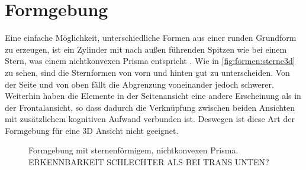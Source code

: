 \section{Formgebung}\label{sec:grundlagen:formgebung}
Eine einfache Möglichkeit, unterschiedliche Formen aus einer runden Grundform zu erzeugen, ist ein Zylinder mit nach außen führenden Spitzen wie bei einem Stern, was einem nichtkonvexen Prisma entspricht \cite{UniformPolyhedra}. Wie in \autoref{fig:formen:sterne3d} zu sehen, sind die Sternformen von vorn und hinten gut zu unterscheiden. Von der Seite und von oben fällt die Abgrenzung voneinander jedoch schwerer. Weiterhin haben die Elemente in der Seitenansicht eine andere Erscheinung als in der Frontalansicht, so dass dadurch die Verknüpfung zwischen beiden Ansichten mit zusätzlichem kognitiven Aufwand verbunden ist. Deswegen ist diese Art der Formgebung für eine 3D Ansicht nicht geeignet.

\begin{figure}
	{\caption{Formgebung mit sternenförmigem, nichtkonvexen Prisma. ERKENNBARKEIT SCHLECHTER ALS BEI TRANS UNTEN?}\label{fig:formen:sterne3d}}
\end{figure}

